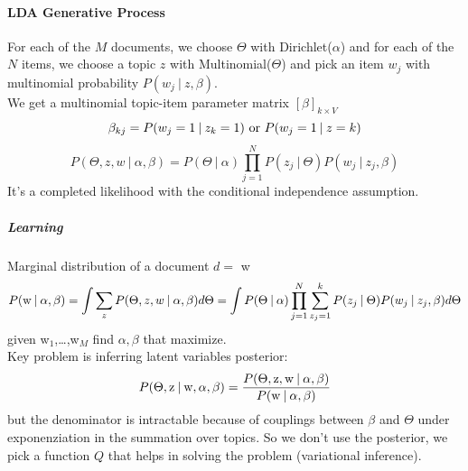 \documentclass[10pt]{report}
\begin{document}
\paragraph{LDA Generative Process} For each of the $M$ documents, we choose $\Theta$ with Dirichlet($\alpha$) and for each of the $N$ items, we choose a topic $z$ with Multinomial($\Theta$) and pick an item $w_j$ with multinomial probability $P(w_j\:|\:z,\beta)$.\\
We get a multinomial topic-item parameter matrix $[\beta]_{k\times V}$
$$\beta_{kj}=P(w_j=1\:|\:z_k=1)\hbox{ or } P(w_j=1\:|\:z=k)$$
$$P(\Theta, z, w\:|\:\alpha,\beta) = P(\Theta\:|\:\alpha)\prod_{j=1}^NP(z_j\:|\:\Theta)P(w_j\:|\:z_j,\beta)$$
It's a completed likelihood with the conditional independence assumption.
\subparagraph{Learning} Marginal distribution of a document $d =$ w
$$P(\hbox{w}\:|\:\alpha,\beta) = \int \sum_z P(\Theta,z,w\:|\:\alpha,\beta)d\Theta=\int P(\Theta\:|\:\alpha)\prod_{j=1}^N\sum_{z_j=1}^kP(z_j\:|\:\Theta)P(w_j\:|\:z_j,\beta)d\Theta$$
given w$_1$,\ldots,w$_M$ find $\alpha,\beta$ that maximize.\\
Key problem is inferring latent variables posterior:
$$P(\Theta, \hbox{z}\:|\:\hbox{w},\alpha,\beta) = \frac{P(\Theta, \hbox{z}, \hbox{w}\:|\:\alpha,\beta)}{P(\hbox{w}\:|\:\alpha,\beta)}$$
but the denominator is intractable because of couplings between $\beta$ and $\Theta$ under exponenziation in the summation over topics. So we don't use the posterior, we pick a function $Q$ that helps in solving the problem (variational inference).
\end{document}
